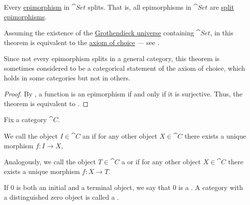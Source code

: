 \begin{theorem}\label{thm:epimorphisms_split_in_set}
  Every \hyperref[def:morphism_invertibility/right_cancellative]{epimorphism} in \hyperref[def:category_of_small_sets]{\( \cat{Set} \)} splits. That is, all epimorphisms in \( \cat{Set} \) are \hyperref[def:morphism_invertibility/right_invertible]{split epimorphisms}.

  Assuming the existence of the \hyperref[def:grothendieck_universe]{Grothendieck universe} containing \( \cat{Set} \), in \hyperref[def:zfc]{} this theorem is equivalent to the \hyperref[def:zfc/choice]{axiom of choice} --- see .

  Since not every epimorphism splits in a general category, this theorem is sometimes considered to be a categorical statement of the axiom of choice, which holds in some categories but not in others.
\end{theorem}
\begin{proof}
  By , a function is an epimorphism if and only if it is surjective. Thus, the theorem is equivalent to .
\end{proof}

\begin{definition}\label{def:zero_objects}
  Fix a category \( \cat{C} \).

  \begin{thmenum}
     We call the object \( I \in \cat{C} \) an  if for any other object \( X \in \cat{C} \) there exists a unique morphism \( f: I \to X \),

     Analogously, we call the object \( T \in \cat{C} \) a  or  if for any other object \( X \in \cat{C} \) there exists a unique morphism \( f: X \to T \).

     If \( 0 \) is both an initial and a terminal object, we say that \( 0 \) is a . A category with a distinguished zero object is called a .
  \end{thmenum}
\end{definition}

